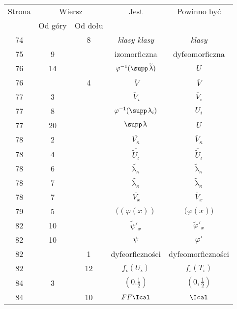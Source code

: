 \documentclass[a4paper,11pt]{article}
\numberwithin{equation}{section}
\renewcommand{\lambda}{\uplambda}
\begin{document}
\begin{center}
  \begin{tabular}{|c|c|c|c|c|}
    \hline
    Strona & \multicolumn{2}{c|}{Wiersz} & Jest
                              & Powinno być \\ \cline{2-3}
    & Od góry & Od dołu & & \\
    \hline
    74  & & \hphantom{0}8 & \textit{klasy klasy} & \textit{klasy} \\
    75  & \hphantom{0}9 & & izomorficzna & dyfeomorficzna \\
    76  & 14 & & $\varphi^{ -1 }( \supp \, \widetilde{ \lambda } )$ & $U$ \\
    76  & & \hphantom{0}4 & $\overline{ \, V }$ & $\overline{ V }$ \\
    77  & \hphantom{0}3 & & $\overline{ \, V }_{ i }$
    & $\overline{ V }_{ i }$ \\
    77  & \hphantom{0}8 & & $\varphi^{ -1 }( \supp \, \lambda_{ i } )$ & $U_{ i }$ \\
    77  & 20 & & $\supp \, \lambda$ & $U$ \\
    78  & \hphantom{0}2 & & $\overline{ V_{ \kappa } }$
    & $\overline{ V }_{ \kappa }$ \\[0.3em]
    78  & \hphantom{0}4 & & $\overline{ \widetilde{ U }_{ \tilde{ \iota } } }$
           & $\overline{ \widetilde{ U } }_{ \tilde{ \iota } }$ \\
    78  & \hphantom{0}6 & & $\widetilde{ \lambda_{ \kappa } }$
    & $\widetilde{ \lambda }_{ \kappa }$ \\
    78  & \hphantom{0}7 & & $\widetilde{ \lambda_{ \kappa } }$
    & $\widetilde{ \lambda }_{ \kappa }$ \\
    78  & \hphantom{0}7 & & $\overline{ \, V_{ x } }$
           & $\overline{ V }_{ x }$ \\
    79  & \hphantom{0}5 & & $( ( \varphi( x ) )$ & $\big( \varphi( x ) \big)$ \\
    82  & 10 & & $\widetilde{ \psi }'_{ x }$
           & $\widetilde{ \varphi }'_{ x }$ \\
    82  & 10 & & $\psi$ & $\varphi'$ \\
    82  & & \hphantom{0}1 & dyfeorficzności & dyfeomorficzności \\
    82  & & 12 & $f_{ \iota }( U_{ \iota } )$ & $f_{ \iota }( T_{ \iota } )$ \\
    84  & \hphantom{0}3 & & $( 0. \frac{ 1 }{ 2 } )$
    & $( 0, \frac{ 1 }{ 2 } )$ \\
    84  & & 10 & $FF\Ical$ & $\Ical$ \\

\end{tabular}
\end{center}
\end{document}
